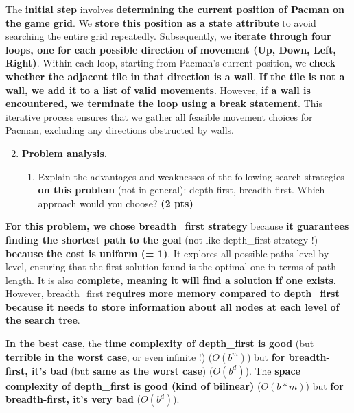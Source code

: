 \documentclass[11pt,a4paper]{report}
\begin{document}
\begin{answer}
The \textbf{initial step} involves \textbf{determining the current position of Pacman on the game grid}. We \textbf{store this position as a state attribute} to avoid searching the entire grid repeatedly.
Subsequently, we \textbf{iterate through four loops, one for each possible direction of movement (Up, Down, Left, Right)}. Within each loop, starting from Pacman's current position, we \textbf{check whether the adjacent tile in that direction is a wall}. \textbf{If the tile is not a wall, we add it to a list of valid movements}. However, \textbf{if a wall is encountered, we terminate the loop using a break statement}. This iterative process ensures that we gather all feasible movement choices for Pacman, excluding any directions obstructed by walls.
\end{answer}



\begin{enumerate}
\setcounter{enumi}{1}
    \item \textbf{Problem analysis.}
    \begin{enumerate}
        \item Explain the advantages and weaknesses of the following search strategies \textbf{on this problem} (not in general): depth first, breadth first. Which approach would you choose? \textbf{(2 pts)}
    \end{enumerate}
\end{enumerate}

\begin{answer}
{\small \textbf{For this problem, we chose breadth\_first strategy } because \textbf{it guarantees finding the shortest path to the goal} (not like depth\_first strategy !) \textbf{because the cost is uniform (= 1)}. It explores all possible paths level by level, ensuring that the first solution found is the optimal one in terms of path length. It is also \textbf{complete, meaning it will find a solution if one exists}. However, breadth\_first \textbf{requires more memory compared to depth\_first because it needs to store information about all nodes at each level of the search tree}.

\textbf{In the best case}, the \textbf{time complexity of depth\_first is good} (but \textbf{terrible in the worst case}, or even infinite !) ({\( O(b^m) \)}) but \textbf{for breadth-first, it's bad} (but \textbf{same as the worst case}) (\textbf{\( O(b^d) \)}).
The \textbf{space complexity of depth\_first is good (kind of bilinear)} (\textbf{\( O(b*m) \)}) but \textbf{for breadth-first, it's very bad} (\textbf{\( O(b^d) \)}). 
}
\end{answer}
\end{document}
